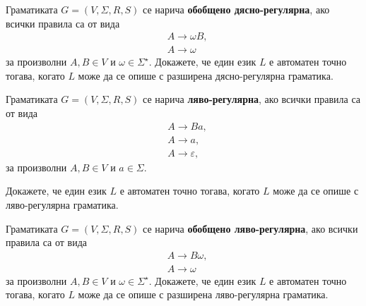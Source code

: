 \begin{extra}

\begin{problem}
  Граматиката $G = (V, \Sigma, R, S)$ се нарича {\bf обобщено дясно-регулярна},
  ако всички правила са от вида 
  \begin{align*}
    & A \to \omega B,\\
    & A \to \omega
  \end{align*}
  за произволни $A, B \in V$ и $\omega \in \Sigma^\star$.
  Докажете, че един език $L$ е автоматен точно тогава, когато $L$ може да се опише с разширена дясно-регулярна граматика.
\end{problem}

\begin{problem}
  Граматиката $G = (V, \Sigma, R, S)$ се нарича {\bf ляво-регулярна},
  ако всички правила са от вида 
  \begin{align*}
    & A \to Ba,\\
    & A \to a,\\
    & A \to \varepsilon,
  \end{align*}
  за произволни $A, B \in V$ и $a \in \Sigma$.

  Докажете, че един език $L$ е автоматен точно тогава, когато $L$ може да се опише с ляво-регулярна граматика.
\end{problem}

\begin{problem}
  Граматиката $G = (V, \Sigma, R, S)$ се нарича {\bf обобщено ляво-регулярна},
  ако всички правила са от вида 
  \begin{align*}
    & A \to B\omega,\\
    & A \to \omega
  \end{align*}
  за произволни $A, B \in V$ и $\omega \in \Sigma^\star$.
  Докажете, че един език $L$ е автоматен точно тогава, когато $L$ може да се опише с разширена ляво-регулярна граматика.
\end{problem}

\end{extra}

